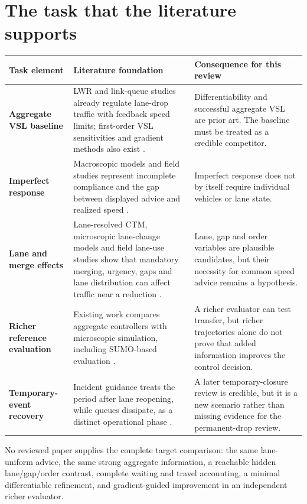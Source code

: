 \documentclass[10pt]{article}
\begin{document}
\section{The task that the literature supports}

\begin{tabularx}{\textwidth}{>{\bfseries}p{} X X}
\toprule
Task element & Literature foundation & Consequence for this review \\
\midrule
Aggregate VSL baseline & LWR and link-queue studies already regulate lane-drop
traffic with feedback speed limits; first-order VSL sensitivities and gradient
methods also exist \cite{jin2013,monache2016}. & Differentiability and successful
aggregate VSL are prior art. The baseline must be treated as a credible
competitor. \\
\addlinespace
Imperfect response & Macroscopic models and field studies represent incomplete
compliance and the gap between displayed advice and realized speed
\cite{frejo2018,caltrans2018}. & Imperfect response does not by itself require
individual vehicles or lane state. \\
\addlinespace
Lane and merge effects & Lane-resolved CTM, microscopic lane-change models and
field lane-use studies show that mandatory merging, urgency, gaps and lane
distribution can affect traffic near a reduction \cite{guo2020,erdmann2015,knoop2010}. &
Lane, gap and order variables are plausible candidates, but their necessity for
common speed advice remains a hypothesis. \\
\addlinespace
Richer reference evaluation & Existing work compares aggregate controllers with
microscopic simulation, including SUMO-based evaluation \cite{guo2020,chen2025}. &
A richer evaluator can test transfer, but richer trajectories alone do not prove
that added information improves the control decision. \\
\addlinespace
Temporary-event recovery & Incident guidance treats the period after lane
reopening, while queues dissipate, as a distinct operational phase
\cite{fhwa2008}. & A later temporary-closure review is credible, but it is a new
scenario rather than missing evidence for the permanent-drop review. \\
\bottomrule
\end{tabularx}

No reviewed paper supplies the complete target comparison: the same lane-uniform
advice, the same strong aggregate information, a reachable hidden lane/gap/order
contrast, complete waiting and travel accounting, a minimal differentiable
refinement, and gradient-guided improvement in an independent richer evaluator.
\end{document}
